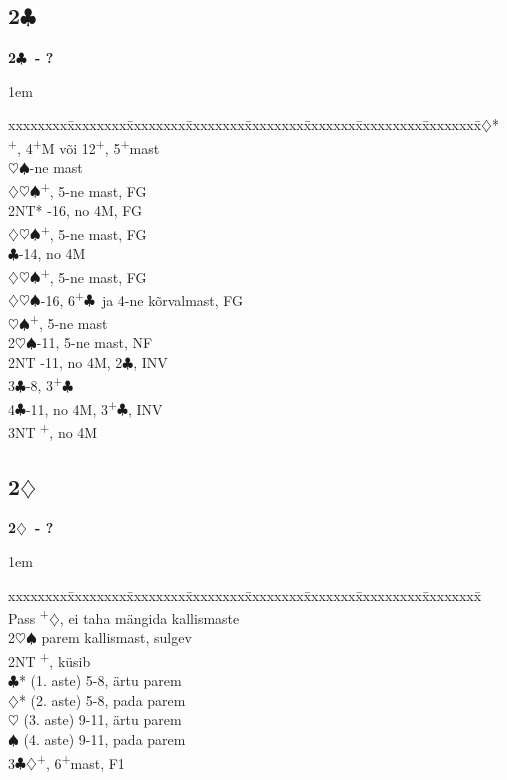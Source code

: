 \documentclass[10pt]{article}
\renewcommand{\c}{$\clubsuit$}
\renewcommand{\d}{$\diamondsuit$}
\newcommand{\h}{$\heartsuit$}
\newcommand{\s}{$\spadesuit$}
\newcommand{\p}{\textsuperscript{+}}
\newcommand{\m}{\textsuperscript{\textminus}}
\newenvironment{bidtable}[1][]
{\textbf{#1}
  \begin{adjustwidth}{1em}{}
    \addvspace{2pt}
    \begin{tabbing}
      xxxxxxxx\=xxxxxxxx\=xxxxxxxx\=xxxxxxxx\=xxxxxxxx\=xxxxxxx\=xxxxxxxxx\=xxxxxxxx\=\kill}
{\end{tabbing}\end{adjustwidth}\bigskip}%
\newcommand{\pdfc}{\texorpdfstring{\c{}}{C}}
\newcommand{\pdfd}{\texorpdfstring{\d{}}{D}}
\begin{document}

\newpage
\subsection{2\pdfc}

\begin{bidtable}[2\c\ - ?]
2\d*  {}\p, 4\p M või 12\p, 5\p mast                   \\
      \h\s   {}-ne mast                            \\
      \>         \d\h\s {}\p, 5-ne mast, FG       \\
      \> 2NT*    -16, no 4M, FG                     \\
      \>         \d\h\s {}\p, 5-ne mast, FG       \\
      \c     {}-14, no 4M                         \\
      \>         \d\h\s {}\p, 5-ne mast, FG       \\
      \d\h\s {}-16, 6\p\c\ ja 4-ne kõrvalmast, FG \\
      \>         \h\s   {}\p, 5-ne mast           \\
2\h\s {}-11, 5-ne mast, NF                             \\
2NT   -11, no 4M, 2\m\c , INV                        \\
3\c   {}-8, 3\p\c                                      \\
4\c   {}-11, no 4M, 3\p\c , INV                        \\
3NT   \p, no 4M
\end{bidtable}

\subsection{2\pdfd}

\begin{bidtable}[2\d\ - ?]
Pass  \p\d , ei taha mängida kallismaste \\
2\h\s \> parem kallismast, sulgev            \\
2NT   \p , küsib                        \\
      \c* \> (1. aste) 5-8, ärtu parem   \\
      \d* \> (2. aste) 5-8, pada parem   \\
      \h  \> (3. aste) 9-11, ärtu parem  \\
      \s  \> (4. aste) 9-11, pada parem  \\
3\c\d {}\p , 6\p mast, F1
\end{bidtable}
\end{document}
